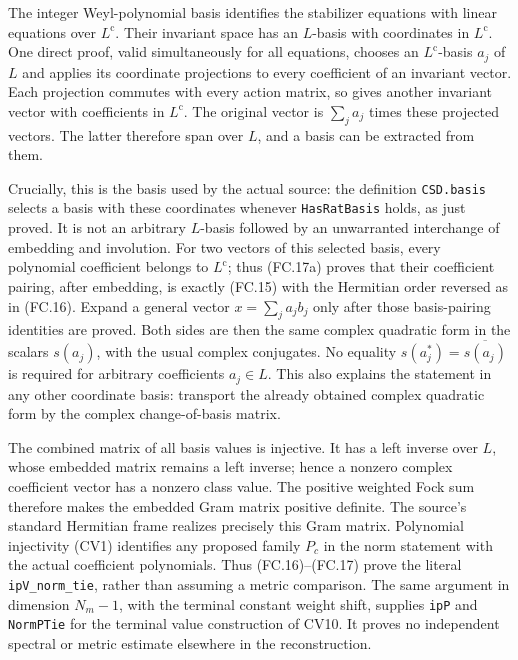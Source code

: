 The integer Weyl-polynomial basis identifies the stabilizer equations
with linear equations over $L^{\mathrm c}$. Their invariant space has
an $L$-basis with coordinates in $L^{\mathrm c}$. One direct proof,
valid simultaneously for all equations, chooses an
$L^{\mathrm c}$-basis $a_j$ of $L$ and applies its coordinate
projections to every coefficient of an invariant vector. Each projection
commutes with every action matrix, so gives another invariant vector
with coefficients in $L^{\mathrm c}$. The original vector is
$\sum_j a_j$ times these projected vectors. The latter therefore span
over $L$, and a basis can be extracted from them.

Crucially, this is the basis used by the actual source: the definition
\texttt{CSD.basis} selects a basis with these coordinates whenever
\texttt{HasRatBasis} holds, as just proved. It is not an arbitrary
$L$-basis followed by an unwarranted interchange of embedding and
involution. For two vectors of this selected basis, every polynomial
coefficient belongs to $L^{\mathrm c}$; thus (FC.17a) proves that
their coefficient pairing, after embedding, is exactly (FC.15) with
the Hermitian order reversed as in (FC.16). Expand a general vector
$x=\sum_j a_jb_j$ only after those basis-pairing identities are proved.
Both sides are then the same complex quadratic form in the scalars
$s(a_j)$, with the usual complex conjugates. No equality
$s(a_j^*)=\overline{s(a_j)}$ is required for arbitrary coefficients
$a_j\in L$. This also explains the statement in any other coordinate
basis: transport the already obtained complex quadratic form by the
complex change-of-basis matrix.

The combined matrix of all basis values is injective. It has a left
inverse over $L$, whose embedded matrix remains a left inverse; hence
a nonzero complex coefficient vector has a nonzero class value.
The positive weighted Fock sum therefore makes the embedded Gram
matrix positive definite. The source's standard Hermitian frame
realizes precisely this Gram matrix. Polynomial injectivity (CV1)
identifies any proposed family $P_c$ in the norm statement with the
actual coefficient polynomials. Thus (FC.16)--(FC.17) prove the literal
\texttt{ipV\_norm\_tie}, rather than assuming a metric comparison.
The same argument in dimension $N_m-1$, with the terminal constant
weight shift, supplies \texttt{ipP} and \texttt{NormPTie} for the
terminal value construction of CV10. It proves no independent spectral
or metric estimate elsewhere in the reconstruction.


